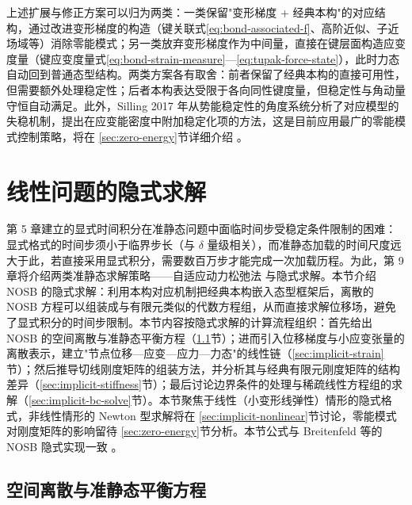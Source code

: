 \begin{remark}
  上述扩展与修正方案可以归为两类：一类保留"变形梯度 + 经典本构"的对应结构，通过改进变形梯度的构造（键关联式\eqref{eq:bond-associated-f}、高阶近似、子近场域等）消除零能模式；另一类放弃变形梯度作为中间量，直接在键层面构造应变度量（键应变度量式\eqref{eq:bond-strain-measure}—\eqref{eq:tupak-force-state}），此时力态自动回到普通态型结构。两类方案各有取舍：前者保留了经典本构的直接可用性，但需要额外处理稳定性；后者本构表达受限于各向同性键度量，但稳定性与角动量守恒自动满足。此外，Silling 2017 年从势能稳定性的角度系统分析了对应模型的失稳机制，提出在应变能密度中附加稳定化项的方法，这是目前应用最广的零能模式控制策略，将在 \ref{sec:zero-energy}节详细介绍 \cite{Silling2017}。
\end{remark}

\section{线性问题的隐式求解}\label{sec:implicit-linear}

第 5 章建立的显式时间积分在准静态问题中面临时间步受稳定条件限制的困难：显式格式的时间步须小于临界步长（与 $\delta$ 量级相关），而准静态加载的时间尺度远大于此，若直接采用显式积分，需要数百万步才能完成一次加载历程。为此，第 9 章将介绍两类准静态求解策略——自适应动力松弛法 \cite{KilicMadenci2010} 与隐式求解。本节介绍 NOSB 的隐式求解：利用本构对应机制把经典本构嵌入态型框架后，离散的 NOSB 方程可以组装成与有限元类似的代数方程组，从而直接求解位移场，避免了显式积分的时间步限制。本节内容按隐式求解的计算流程组织：首先给出 NOSB 的空间离散与准静态平衡方程（\ref{sec:implicit-discretize}节）；进而引入位移梯度与小应变张量的离散表示，建立"节点位移—应变—应力—力态"的线性链（\ref{sec:implicit-strain}节）；然后推导切线刚度矩阵的组装方法，并分析其与经典有限元刚度矩阵的结构差异（\ref{sec:implicit-stiffness}节）；最后讨论边界条件的处理与稀疏线性方程组的求解（\ref{sec:implicit-bc-solve}节）。本节聚焦于线性（小变形线弹性）情形的隐式格式，非线性情形的 Newton 型求解将在 \ref{sec:implicit-nonlinear}节讨论，零能模式对刚度矩阵的影响留待 \ref{sec:zero-energy}节分析。本节公式与 Breitenfeld 等的 NOSB 隐式实现一致 \cite{Breitenfeld2014,BreitenfeldThesis2014}。

\subsection{空间离散与准静态平衡方程}\label{sec:implicit-discretize}

